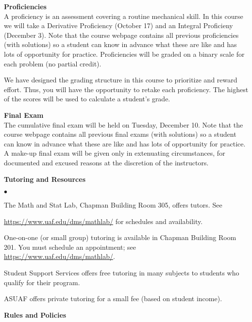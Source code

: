 \documentclass[12pt]{article}
\renewcommand{\emph}[1]{\textsf{\textbf{#1}}}
\newcommand{\localhead}[1]{\par\smallskip\textbf{#1}\nobreak\\}%
\def\heading#1{\localhead{\large\emph{#1}}}
\def\subheading#1{\localhead{\emph{#1}}}
\newenvironment{clist}%
{\bgroup\parskip 0pt\begin{list}{$\bullet$}{\partopsep 4pt\topsep 0pt\itemsep -2pt}}%
{\end{list}\egroup}%
\begin{document}
\heading{Proficiencies}
A proficiency is an assessment covering a routine mechanical skill.  In this course we will take a Derivative Proficiency (October 17) and an Integral Proficieny (December 3). Note that the course webpage contains all previous proficiencies (with solutions) so a student can know in advance what these are like and has lots of opportunity for practice. Proficiencies will be graded on a binary scale for each problem (no partial credit).  

We have designed the grading structure in this course to prioritize and reward effort. Thus, you will have the opportunity to retake each proficiency. The highest of the scores will be used to calculate a student's grade. 

\heading{Final Exam} 
The cumulative final exam will be held on Tuesday, December 10. Note that the course webpage contains all previous final exams (with solutions) so a student can know in advance what these are like  and has lots of opportunity for practice. A make-up final exam will be given only in extenuating circumstances, for documented and excused reasons at the discretion of the instructors.

\heading{Tutoring and Resources}
\vskip -30pt\strut
\begin{clist}
	\item The Math and Stat Lab, Chapman Building Room 305, offers tutors. 
	See 

	\url{https://www.uaf.edu/dms/mathlab/} for schedules and availability.
	\item One-on-one (or small group) tutoring is available in 
Chapman Building Room 201. You must schedule an
appointment; see \url{https://www.uaf.edu/dms/mathlab/}.
	\item Student Support Services offers free tutoring in many subjects to students who qualify for their program.
	\item ASUAF offers private tutoring for a small fee (based on student income).
\end{clist}

\heading{Rules and Policies}
\vskip -20pt
\end{document}

